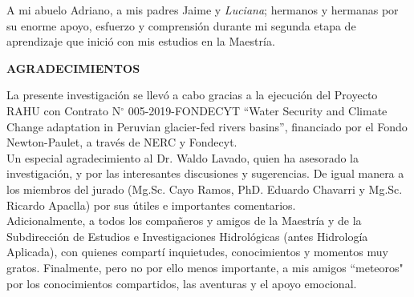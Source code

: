 \begin{flushright}
A mi abuelo Adriano, a mis padres Jaime y \textit{Luciana}; hermanos y hermanas por su enorme apoyo, esfuerzo y comprensión durante mi segunda etapa de aprendizaje que inició con mis estudios en la Maestría.
\end{flushright}

\clearpage
\begin{center}
\large{\textbf {AGRADECIMIENTOS}}
\end{center}

\begin{flushright}

La presente investigación se llevó a cabo gracias a la ejecución del Proyecto RAHU con Contrato N$^{\circ}$ 005-2019-FONDECYT “Water Security and Climate Change adaptation in Peruvian glacier-fed rivers basins”, financiado por el Fondo Newton-Paulet, a través de NERC y Fondecyt.\\
Un especial agradecimiento al Dr. Waldo Lavado, quien ha asesorado la investigación, y por las interesantes discusiones y sugerencias. De igual manera a los miembros del jurado (Mg.Sc. Cayo Ramos, PhD. Eduardo Chavarri y Mg.Sc. Ricardo Apaclla) por sus útiles e importantes comentarios.\\
Adicionalmente, a todos los compañeros y amigos de la Maestría y de la Subdirección de Estudios e Investigaciones Hidrológicas (antes Hidrología Aplicada), con quienes compartí inquietudes, conocimientos y momentos muy gratos. Finalmente, pero no por ello menos importante, a mis amigos “meteoros" por los conocimientos compartidos, las aventuras y el apoyo emocional.
\end{flushright}
